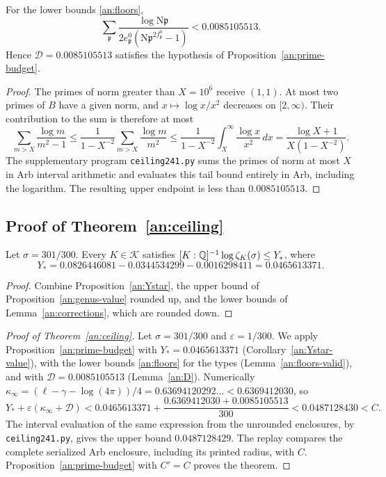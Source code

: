 \begin{lemma}\label{an:D}
For the lower bounds \eqref{an:floors},
\begin{equation}\label{an:R}
 \sum_{\mathfrak p}\frac{\log\mathrm N\mathfrak p}
 {2e^0_{\mathfrak p}(\mathrm N\mathfrak p^{2f^0_{\mathfrak p}}-1)}
 <0.0085105513.
\end{equation}
Hence $\mathcal D=0.0085105513$ satisfies the hypothesis of
Proposition~\ref{an:prime-budget}.
\end{lemma}

\begin{proof}
The primes of norm greater than $X=10^6$ receive $(1,1)$. At most two primes
of $B$ have a given norm, and $x\mapsto\log x/x^2$ decreases on
$[2,\infty)$. Their contribution to the sum is therefore at most
\[
 \sum_{m>X}\frac{\log m}{m^2-1}
 \le\frac{1}{1-X^{-2}}\sum_{m>X}\frac{\log m}{m^2}
 \le\frac{1}{1-X^{-2}}\int_X^\infty\frac{\log x}{x^2}\,dx
 =\frac{\log X+1}{X(1-X^{-2})}.
\]
The supplementary program \texttt{ceiling241.py} sums the primes of norm at
most $X$ in Arb interval arithmetic and evaluates this tail bound entirely
in Arb, including the logarithm. The resulting upper endpoint is less
than $0.0085105513$.
\end{proof}

\subsection{\texorpdfstring{Proof of Theorem~\ref{an:ceiling}}{Proof of the Upper Bound}}

\begin{corollary}\label{an:Ystar-value}
Let $\sigma=301/300$. Every $K\in\mathcal K$ satisfies
$[K:\mathbb Q]^{-1}\log\zeta_K(\sigma)\le Y_*$, where
\[
 Y_*=0.0826446081-0.0344534299-0.0016298411=0.0465613371.
\]
\end{corollary}

\begin{proof}
Combine Proposition~\ref{an:Ystar}, the upper bound of
Proposition~\ref{an:genus-value} rounded up, and the lower bounds of
Lemma~\ref{an:corrections}, which are rounded down.
\end{proof}

\begin{proof}[Proof of Theorem~\ref{an:ceiling}]
Let $\sigma=301/300$ and $\varepsilon=1/300$. We apply
Proposition~\ref{an:prime-budget} with $Y_*=0.0465613371$
(Corollary~\ref{an:Ystar-value}), with the lower bounds \eqref{an:floors}
for the types (Lemma~\ref{an:floors-valid}), and with
$\mathcal D=0.0085105513$ (Lemma~\ref{an:D}). Numerically
$\kappa_\infty=(\ell-\gamma-\log(4\pi))/4=0.63694120292\ldots<0.6369412030$,
so
\[
 Y_*+\varepsilon(\kappa_\infty+\mathcal D)
 <0.0465613371+\frac{0.6369412030+0.0085105513}{300}
 <0.0487128430<C.
\]
The interval evaluation of the same expression from the unrounded
enclosures, by \texttt{ceiling241.py}, gives the upper bound
$0.0487128429$. The replay compares the complete serialized Arb enclosure,
including its printed radius, with $C$. Proposition~\ref{an:prime-budget} with $C'=C$ proves
the theorem.
\end{proof}

